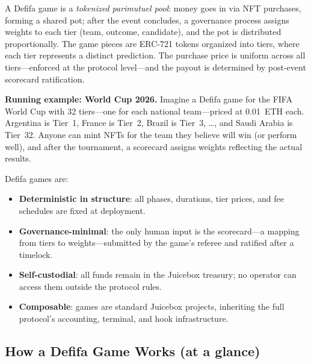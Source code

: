 \documentclass[11pt,a4paper]{article}
\begin{document}
A Defifa game is a \emph{tokenized parimutuel pool}: money goes in via NFT purchases, forming a shared pot; after the event concludes, a governance process assigns weights to each tier (team, outcome, candidate), and the pot is distributed proportionally. The game pieces are ERC-721 tokens organized into tiers, where each tier represents a distinct prediction. The purchase price is uniform across all tiers---enforced at the protocol level---and the payout is determined by post-event scorecard ratification.

\textbf{Running example: World Cup 2026.} Imagine a Defifa game for the FIFA World Cup with 32 tiers---one for each national team---priced at 0.01~ETH each. Argentina is Tier~1, France is Tier~2, Brazil is Tier~3, \ldots, and Saudi Arabia is Tier~32. Anyone can mint NFTs for the team they believe will win (or perform well), and after the tournament, a scorecard assigns weights reflecting the actual results.

Defifa games are:
\begin{itemize}[nosep]
    \item \textbf{Deterministic in structure}: all phases, durations, tier prices, and fee schedules are fixed at deployment.
    \item \textbf{Governance-minimal}: the only human input is the scorecard---a mapping from tiers to weights---submitted by the game's referee and ratified after a timelock.
    \item \textbf{Self-custodial}: all funds remain in the Juicebox treasury; no operator can access them outside the protocol rules.
    \item \textbf{Composable}: games are standard Juicebox projects, inheriting the full protocol's accounting, terminal, and hook infrastructure.
\end{itemize}

\subsection{How a Defifa Game Works (at a glance)}
\end{document}
